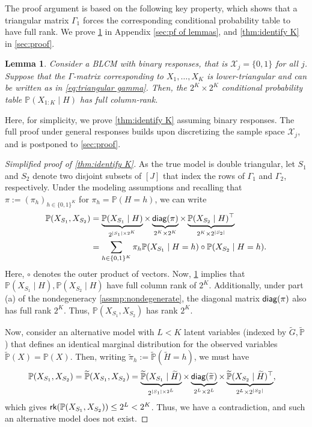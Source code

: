 \documentclass[10pt]{article} %
\newtheorem{lemma}{Lemma}
\newcommand{\PP}{\mathbb P}
\newcommand{\mcx}{\mathcal X}
\newcommand{\rk}{\textsf{\upshape rk}}
\newcommand{\diag}{\textsf{\upshape diag}}
\def\tilde{\widetilde}
\begin{document}
The proof argument is based on the following key property, which shows that a triangular matrix $\Gamma_1$ forces the corresponding conditional probability table to have full rank.
%
We prove \cref{lem:full rank} in Appendix \ref{sec:pf of lemmas}, and \cref{thm:identify K} in \cref{sec:proof}.
\begin{lemma}\label{lem:full rank}
    Consider a BLCM with binary responses, that is $\mcx_j = \{0,1\}$ for all $j$. %
    Suppose that the $\Gamma$-matrix corresponding to $X_1, \ldots, X_K$ is lower-triangular and can be written as in \eqref{eq:triangular gamma}. 
    Then, the $2^K \times 2^K$ conditional probability table $\PP(X_{1:K} \mid H)$ %
    has full column-rank.
\end{lemma}

Here, for simplicity, we prove \cref{thm:identify K} assuming binary responses. The full proof under general responses builds upon discretizing the sample space $\mathcal{X}_j$, and is postponed to \cref{sec:proof}.

\begin{proof}[Simplified proof of \cref{thm:identify K}]
As the true model is double triangular, let $S_1$ and $S_2$ denote two disjoint subsets of $[J]$ that index the rows of $\Gamma_1$ and $\Gamma_2$, respectively. %
    Under the modeling assumptions and recalling that $\pi := (\pi_h)_{h \in \{0,1\}^K}$ for $\pi_h = \PP(H=h)$, we can write
    \begin{align}\label{eq:pmf matrix decomposition}
        \PP(X_{S_1} , X_{S_2}) & = \underbrace{{\PP}(X_{S_1} \mid {H})}_{2^{|S_1| \times 2^{K}}} \times \underbrace{\diag(\pi)}_{2^K \times 2^K} \times \underbrace{{\PP}(X_{S_2} \mid {H})^\top}_{2^{K} \times 2^{|S_2|}} \\
        &= \sum_{h \in \{0,1\}^K} \pi_h \PP(X_{S_1} \mid H=h) \circ \PP(X_{S_2} \mid H=h). \notag
    \end{align}
    Here, $\circ$ denotes the outer product of vectors.
    Now, \cref{lem:full rank} implies that ${\PP}(X_{S_1} \mid {H}), {\PP}(X_{S_2} \mid {H})$ have full column rank of $2^K$. Additionally, under part (a) of the nondegeneracy \cref{assmp:nondegenerate}, the diagonal matrix $\diag(\pi)$ also has full rank $2^K$. Thus, $\PP(X_{S_1}, X_{S_2})$ has rank $2^K$.

    Now, consider an alternative model with $L < K$ latent variables (indexed by $\tilde{G}, \tilde{\PP}$) that defines an identical marginal distribution for the observed variables $\tilde{\PP}(X) = \PP(X)$. Then, writing $\tilde{\pi}_h := \tilde{\PP}(\tilde{H}=h)$, we must have 
    \begin{align*}
        \PP(&X_{S_1} , X_{S_2}) = \tilde{\PP}(X_{S_1}, X_{S_2}) = \underbrace{\tilde{\PP}(X_{S_1} \mid \tilde{H})}_{2^{|S_1| \times 2^{L}}} \times \underbrace{\diag(\tilde{\pi})}_{2^L \times 2^L} \times \underbrace{\tilde{\PP}(X_{S_2} \mid \tilde{H})^\top}_{2^{L} \times 2^{|S_2|}},
    \end{align*}
    which gives $\rk(\PP(X_{S_1}, X_{S_2})) \le 2^L < 2^K$. Thus, we have a contradiction, and such an alternative model does not exist. 
\end{proof}
\end{document}

